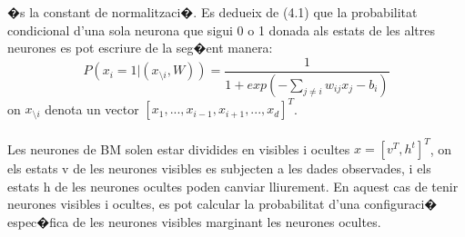 \documentclass[12pt,a4paper,openright,oneside]{article}
\numberwithin{equation}{section}
\theoremstyle{definition}
\begin{document}
 �s la constant de normalitzaci�. Es dedueix de (4.1) que la probabilitat condicional d'una sola neurona que sigui 0 o 1 donada als estats de les altres neurones es pot escriure de la seg�ent manera: 
\begin{equation}
P(x_i = 1|(x_{\setminus i},W)) = \frac{1}{1 + exp(-\sum_{j\neq i}w_{ij}x_j - b_i)}
\end{equation}
on ${x_{\setminus i}}$ denota un vector ${[x_1,...,x_{i-1},x_{i+1},..., x_d]^T }$. \\\\
Les neurones de BM solen estar dividides en visibles i ocultes ${x = [v^T, h^t]^T}$, on els estats v de les neurones visibles es subjecten a les dades observades, i els estats h de les neurones ocultes poden canviar lliurement. En aquest cas de tenir neurones visibles i ocultes, es pot calcular la probabilitat d'una configuraci� espec�fica de les neurones visibles marginant les neurones ocultes.\\\\
\end{document}
